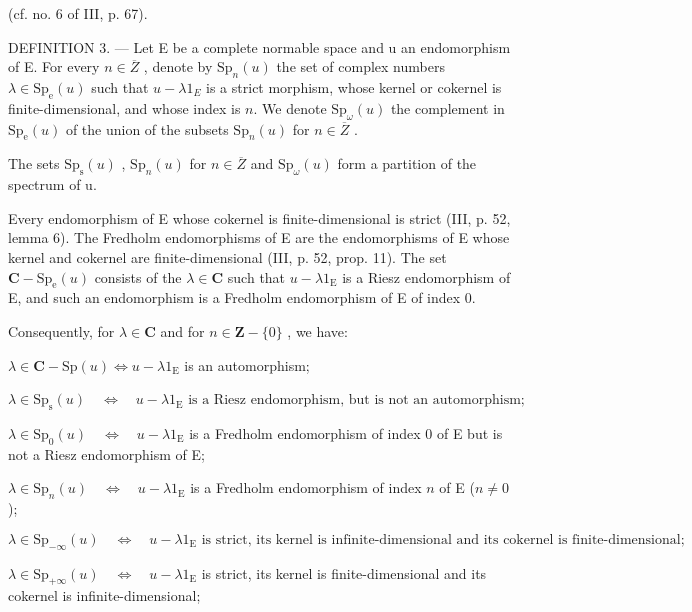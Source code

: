 (cf. no. 6 of III, p. 67).

DEFINITION 3. --- Let E be a complete normable space and u an endomorphism of E. For every \(n \in \overline{Z}\) , denote by \(\mathrm{Sp}_{n}(u)\) the set of complex numbers \(\lambda \in \mathrm{Sp}_{\mathrm{e}}(u)\) such that \(u - \lambda1_{E}\) is a strict morphism, whose kernel or cokernel is finite-dimensional, and whose index is \(n\). We denote \(\mathrm{Sp}_{\omega}(u)\) the complement in \(\mathrm{Sp}_{\mathrm{e}}(u)\) of the union of the subsets \(\mathrm{Sp}_{n}(u)\) for \(n \in \overline{Z}\) .

The sets \(\mathrm{Sp}_{\mathrm{s}}(u)\) , \(\mathrm{Sp}_{n}(u)\) for \(n \in \overline{Z}\) and \(\mathrm{Sp}_{\omega}(u)\) form a partition of the spectrum of u.

Every endomorphism of E whose cokernel is finite-dimensional is strict (III, p. 52, lemma 6). The Fredholm endomorphisms of E are the endomorphisms of E whose kernel and cokernel are finite-dimensional (III, p. 52, prop. 11). The set \(\mathbf{C} - \mathrm{Sp}_{\mathrm{e}}(u)\) consists of the \(\lambda \in \mathbf{C}\) such that \(u - \lambda 1_{\mathrm{E}}\) is a Riesz endomorphism of E, and such an endomorphism is a Fredholm endomorphism of E of index 0.

Consequently, for \(\lambda \in \mathbf{C}\) and for \(n\in \mathbf{Z} - \{0\}\) , we have:

\(\lambda \in \mathbf{C} - \mathrm{Sp}(u) \iff u - \lambda 1_{\mathrm{E}}\) is an automorphism;

\(\lambda \in \mathrm{Sp}_{\mathrm{s}}(u) \quad \Longleftrightarrow \quad u - \lambda 1_{\mathrm{E}} \text{ is a Riesz endomorphism, but is not an automorphism;}\)

\(\lambda \in \mathrm{Sp}_{0}(u) \quad \Longleftrightarrow \quad u - \lambda 1_{\mathrm{E}}\) is a Fredholm endomorphism of index 0 of E but is not a Riesz endomorphism of E;

\(\lambda \in \mathrm{Sp}_n(u) \quad \Longleftrightarrow \quad u - \lambda 1_{\mathrm{E}}\) is a Fredholm endomorphism of index \(n\) of E (\(n \neq 0\));

\[
\lambda \in \mathrm{Sp} _ {- \infty} (u) \quad \Longleftrightarrow \quad u - \lambda 1 _ {\mathrm{E}} \text{ is strict, its kernel is infinite-dimensional and its cokernel is finite-dimensional;}
\]

\(\lambda \in \mathrm{Sp}_{+\infty}(u) \quad \Longleftrightarrow \quad u - \lambda 1_{\mathrm{E}}\) is strict, its kernel is finite-dimensional and its cokernel is infinite-dimensional;

